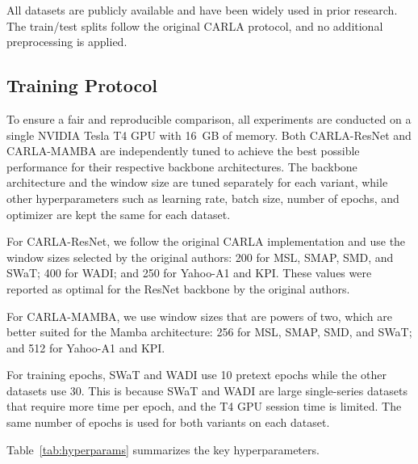 \documentclass{svproc}
\begin{document}
All datasets are publicly available and have been widely used in prior research. The train/test splits follow the original CARLA protocol, and no additional preprocessing is applied.

\subsection{Training Protocol}

To ensure a fair and reproducible comparison, all experiments are conducted on a single NVIDIA Tesla T4 GPU with 16~GB of memory. Both CARLA-ResNet and CARLA-MAMBA are independently tuned to achieve the best possible performance for their respective backbone architectures. The backbone architecture and the window size are tuned separately for each variant, while other hyperparameters such as learning rate, batch size, number of epochs, and optimizer are kept the same for each dataset.

For CARLA-ResNet, we follow the original CARLA implementation \cite{darban2024carla} and use the window sizes selected by the original authors: 200 for MSL, SMAP, SMD, and SWaT; 400 for WADI; and 250 for Yahoo-A1 and KPI. These values were reported as optimal for the ResNet backbone by the original authors.

For CARLA-MAMBA, we use window sizes that are powers of two, which are better suited for the Mamba architecture: 256 for MSL, SMAP, SMD, and SWaT; and 512 for Yahoo-A1 and KPI.

For training epochs, SWaT and WADI use 10 pretext epochs while the other datasets use 30. This is because SWaT and WADI are large single-series datasets that require more time per epoch, and the T4 GPU session time is limited. The same number of epochs is used for both variants on each dataset.

Table~\ref{tab:hyperparams} summarizes the key hyperparameters.
\end{document}
